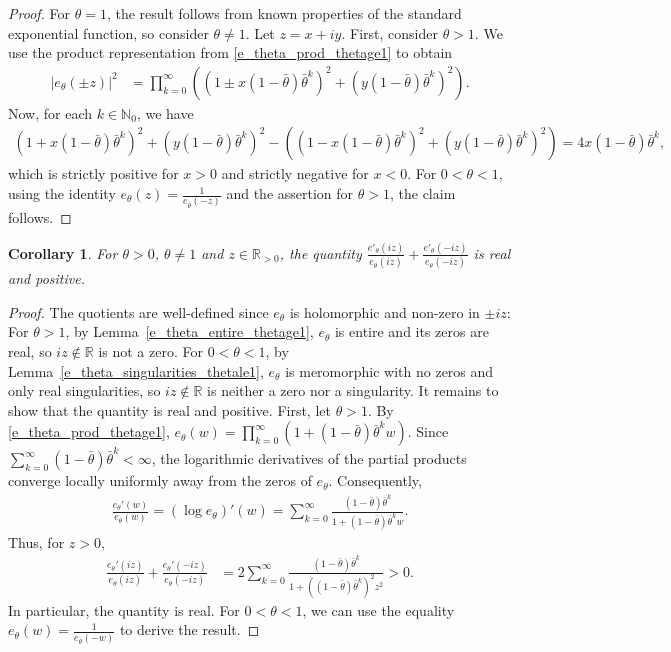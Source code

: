 \documentclass[12pt]{article}
\newcommand{\N}{\mathbb{N}} %
\newcommand{\R}{\mathbb{R}} %
\newcommand{\1}{\mathds{1}}
\theoremstyle{definition}
\theoremstyle{plain}
\newtheorem{Corollary}[definition]{Corollary}
\theoremstyle{remark}
\begin{document}
\begin{proof}
For $\theta=1$, the result follows from known properties of the standard exponential function, so consider $\theta\ne 1$.
  Let $z=x+iy$. 
  First, consider $\theta >1$. We use the product representation from \eqref{e_theta_prod_thetage1} to obtain
  \begin{align*}
       |e_{\theta}(\pm z)|^2&=\prod_{k=0}^\infty((1 \pm x(1-\bar\theta)\bar\theta^k)^2+(y(1-\bar\theta)\bar\theta^k)^2).
  \end{align*}
  Now, for each $k\in\N_0$, we have
  \begin{align*}
      (1+x(1-\bar\theta)\bar\theta^k)^2+(y(1-\bar\theta)\bar\theta^k)^2-((1-x(1-\bar\theta)\bar\theta^k)^2+(y(1-\bar\theta)\bar\theta^k)^2)=4x(1-\bar\theta)\bar\theta^k,
  \end{align*}
  which is strictly positive for $x>0$ and strictly negative for $x<0$. For $0<\theta<1$, using the identity $e_\theta(z)=\frac{1}{e_{\bar\theta}(-z)}$ and the assertion for $\theta>1$, the claim follows. %
\end{proof}
\begin{Corollary}\label{estimate_pos_e_prime_e}
    For $\theta>0$, $\theta\ne 1$ and $z\in\R_{>0}$, the quantity $\frac{e'_{\theta} (iz)}{e_{\theta} (iz)}+\frac{e'_{\theta}(-iz)}{e_{\theta}(-iz)}$ is real and positive.
\end{Corollary}
\begin{proof}
The quotients are well-defined since $e_\theta$ is holomorphic and non-zero in $\pm iz$: For $\theta>1$, by Lemma~\ref{e_theta_entire_thetage1}, $e_\theta$ is entire and its zeros are real, so $iz\notin \R$ is not a zero. For $0<\theta<1$, by Lemma~\ref{e_theta_singularities_thetale1}, $e_\theta$ is meromorphic with no zeros and only real singularities, so $iz\notin\R$ is neither a zero nor a singularity. It remains to show that the quantity is real and positive.
    First, let $\theta >1$.
    By \eqref{e_theta_prod_thetage1}, $ e_\theta(w)=\prod_{k=0}^\infty(1+(1-\bar\theta)\bar\theta^kw)$.
    Since $\sum_{k=0}^\infty (1-\bar\theta)\bar\theta^k<\infty$, the logarithmic derivatives
    of the partial products converge locally uniformly away from the
    zeros of $e_\theta$. Consequently,
    \begin{align*}
        \frac{e_\theta'(w)}{e_\theta(w)}=(\log e_\theta)'(w)=\sum_{k=0}^\infty\frac{(1-\bar\theta)\bar\theta^k}{1+(1-\bar\theta)\bar\theta^kw}.
    \end{align*}
    Thus, for $z>0$,
    \begin{align*}
        \frac{e_\theta'(iz)}{e_\theta(iz)}
        +\frac{e_\theta'(-iz)}{e_\theta(-iz)}
        &=
        2\sum_{k=0}^\infty
        \frac{(1-\bar\theta)\bar\theta^k}{1+((1-\bar\theta)\bar\theta^k)^2z^2}
        >0.
    \end{align*}
In particular, the quantity is real. For $0<\theta<1$, we can use the equality $e_\theta(w)=\frac{1}{e_{\bar\theta}(-w)}$ to derive the result.
\end{proof}
\end{document}
